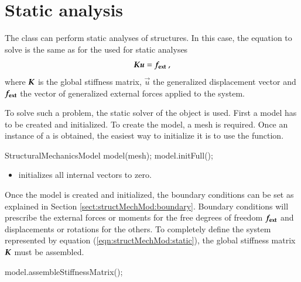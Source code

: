 \section{Static analysis\label{sect:structMechMod:static}}

The    class   can  perform  static  analyses  of
structures.  In  this case,  the  equation  to solve  is  the  same  as for  the
 used for static analyses
\begin{equation}\label{eqn:structMechMod:static}
  \boldsymbol{K} \boldsymbol{u} = \boldsymbol{f_{{\mathrm{ext}}}}~,
\end{equation}
where  $\boldsymbol{K}$ is  the  global stiffness  matrix,  $\vec{u}$ the  generalized displacement 
vector  and  $\boldsymbol{f_{{\mathrm{ext}}}}$ the  vector of generalized external  forces   applied to  the
system.


To     solve    such     a    problem,     the    static     solver     of    the
  object is used.   First a
model has to be  created and initialized.  To create the model,  a mesh is required.
Once an instance of a  is obtained, the easiest way to
initialize it is  to use the 
function.

\begin{cpp}
  StructuralMechanicsModel model(mesh);
  model.initFull();
\end{cpp}


\begin{itemize}
\item {}  initializes all internal vectors to zero.
\end{itemize}


Once the model is created and  initialized, the boundary conditions can be set as
explained   in  Section   \ref{sect:structMechMod:boundary}.   Boundary   conditions  will
prescribe   the   external   forces or moments    for   the   free   degrees   of   freedom
$\boldsymbol{f_{{\mathrm{ext}}}}$ and displacements or rotations for the others.  To completely define the
system  represented  by equation  (\ref{eqn:structMechMod:static}),  the global  stiffness
matrix            $\boldsymbol{K}$             must            be            assembled.

\begin{cpp}
  model.assembleStiffnessMatrix();
\end{cpp}

